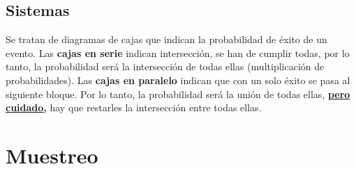 \documentclass[a4paper, twocolumn, 10pt]{article}
\begin{document}
\subsection{Sistemas}

Se tratan de diagramas de cajas que indican la probabilidad de éxito de un evento. Las \textbf{cajas en serie} indican intersección, se han de cumplir todas, por lo tanto, la probabilidad será la intersección de todas ellas (multiplicación de probabilidades). Las \textbf{cajas en paralelo} indican que con un solo éxito se pasa al siguiente bloque. Por lo tanto, la probabilidad será la unión de todas ellas, \underline{\textbf{pero cuidado,}} hay que restarles la intersección entre todas ellas. 

\section{Muestreo}
\end{document}
